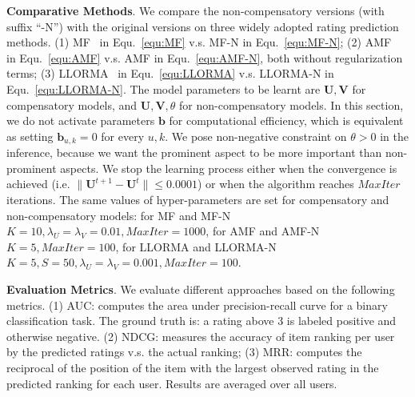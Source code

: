 \documentclass[letterpaper]{article} %
\begin{document}
\textbf{Comparative Methods}. We compare the non-compensatory versions (with suffix ``-N'') with the original versions on three widely adopted rating prediction methods. (1) MF~\cite{Koren2009Matrix} in Equ.~\ref{equ:MF} v.s. MF-N in Equ.~\ref{equ:MF-N};  (2) AMF~\cite{Koren2008Factorization} in Equ.~\ref{equ:AMF} v.s. AMF in Equ.~\ref{equ:AMF-N}, both without regularization terms; (3) LLORMA~\cite{Lee2016LLORMA} in Equ.~\ref{equ:LLORMA} v.s. LLORMA-N in Equ.~\ref{equ:LLORMA-N}. The model parameters to be learnt are $\mathbf{U},\mathbf{V}$ for compensatory models, and  $\mathbf{U},\mathbf{V},\theta$ for non-compensatory models. In this section, we do not activate parameters $\mathbf{b}$ for computational efficiency, which is equivalent as setting $\mathbf{b}_{u,k}=0$ for every $u,k$. We pose non-negative constraint on $\theta>0$ in the inference, because we want the prominent aspect to be more important than non-prominent aspects. We stop the learning process either when the convergence is achieved (i.e. $\|\mathbf{U}^{t+1}-\mathbf{U}^t\|\leq 0.0001$) or when the algorithm reaches $MaxIter$ iterations. The same values of hyper-parameters are set for compensatory and non-compensatory models: for MF and MF-N $K=10, \lambda_U=\lambda_V=0.01, MaxIter=1000$, for AMF and AMF-N $K=5, MaxIter=100$, for LLORMA and LLORMA-N $K=5, S=50, \lambda_U=\lambda_V=0.001, MaxIter=100$.

\textbf{Evaluation Metrics}.  We evaluate different approaches based on the following metrics. (1) AUC: computes the area under precision-recall curve for a binary classification task.  The ground truth is: a rating above 3 is labeled positive and otherwise negative. (2) NDCG: measures the accuracy of item ranking per user by the predicted ratings v.s. the actual ranking; (3)  MRR: computes the reciprocal of the position of the item with the largest observed rating in the predicted ranking for each user. Results are averaged over all users. 
\end{document}
